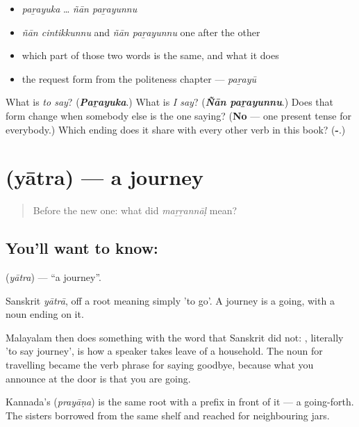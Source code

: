 \begin{itemize}
\raggedright
  \item \emph{paṟayuka} … \emph{ñān paṟayunnu}
  \item \emph{ñān cintikkunnu} and \emph{ñān paṟayunnu} one after the other
  \item which part of those two words is the same, and what it does
  \item the request form from the politeness chapter — \emph{paṟayū}
\end{itemize}

\begin{tcolorbox}[breakable,colback=teal!4,colframe=teal!35!black,title={Before you move on}]
What is \emph{to say}? (\emph{\textbf{Paṟayuka}}.) What is \emph{I say}? (\emph{\textbf{Ñān paṟayunnu}}.) Does that form change when somebody else is the one saying? (\textbf{No} — one present tense for everybody.) Which ending does it share with every other verb in this book? (\textbf{-}.)
\end{tcolorbox}
\section[\texorpdfstring{\ml{യാത്ര} (yātra)}{യാത്ര (yātra)}]{ (yātra) — a journey}

\label{lesson:ML-C50-journey}



\begin{quote}
Before the new one: what did \emph{maṟṟannāḷ} mean?
\end{quote}

\subsection*{You'll want to know: }
\textbf{} (\emph{yātra}) — \textquotedblleft{}a journey\textquotedblright{}.

Sanskrit \emph{yātrā}, off a root meaning simply 'to go'. A journey is a going, with a noun ending on it.

Malayalam then does something with the word that Sanskrit did not:  , literally 'to say journey', is how a speaker takes leave of a household. The noun for travelling became the verb phrase for saying goodbye, because what you announce at the door is that you are going.

Kannada's  (\emph{prayāṇa}) is the same root with a prefix in front of it — a going-forth. The sisters borrowed from the same shelf and reached for neighbouring jars.

